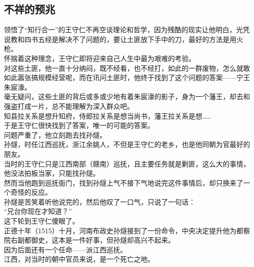 \begin{multicols}{\theparacolNo}
\subsection{不祥的预兆}
领悟了“知行合一”的王守仁不再空谈理论和哲学，因为残酷的现实让他明白，光凭说教和四书五经是解决不了问题的，要让土匪放下手中的刀，最好的方法是用火枪。\\

怀揣着这种理念，王守仁即将迎来自己人生中最为艰难的考验。\\

对这些土匪，他一直十分纳闷，既不经看，也不经打，如此的一群废物，怎么就敢如此嚣张搞规模经营呢，而在讯问土匪时，他终于找到了这个问题的答案——宁王朱宸濠。\\

毫无疑问，这些土匪的背后或多或少地有着朱宸濠的影子，身为一个藩王，却去和强盗打成一片，总不能理解为深入群众吧。\\

知县拉关系是想升知府，侍郎拉关系是想当尚书，藩王拉关系是想……\\

于是王守仁很快找到了答案，唯一的可能的答案。\\

问题严重了，他立刻跑去找孙燧。\\

孙燧，时任江西巡抚，浙江余姚人，不但是王守仁的老乡，也是他同朝为官最好的朋友。\\

当时的王守仁只是江西南部（赣南）巡抚，且主要任务就是剿匪，这么大的事情，他没法拍板当家，只能找孙燧。\\

然而当他跑到巡抚衙门，找到孙燧上气不接下气地说完这件事情后，却只换来了一个奇怪的反应。\\

孙燧是苦笑着听他说完的，然后他叹了一口气，只说了一句话：\\

“兄台你现在才知道？”\\

这下轮到王守仁傻眼了。\\

正德十年（1515）十月，河南布政史孙燧接到了一份命令，中央决定提升他为都察院右副都御史，这本是一件好事，但孙燧却高兴不起来。\\

因为后面还有一个任命——派江西巡抚。\\

江西，对当时的朝中官员来说，是一个死亡之地。\\


\end{multicols}
